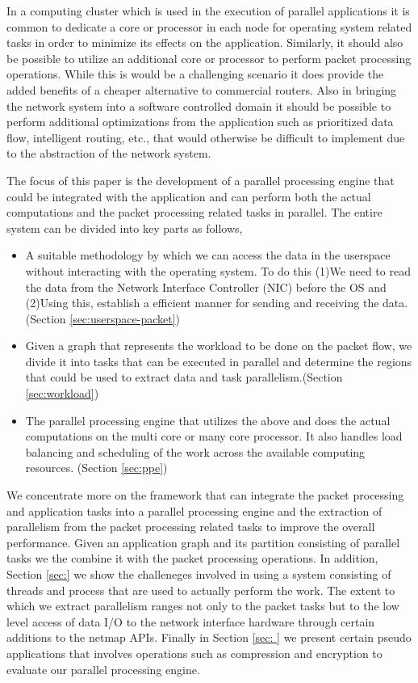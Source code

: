 \documentclass[conference]{IEEEtran}
\begin{document}
In a computing cluster which is used in the execution of parallel applications it is common to dedicate a core or processor in each node for operating system related tasks in order to minimize its effects on the application. Similarly, it should also be possible to utilize an additional core or processor to perform packet processing operations. While this is would be a challenging scenario it does provide the added benefits of a cheaper alternative to commercial routers. Also in bringing the network system into a software controlled domain it should be possible to perform additional optimizations from the application such as prioritized data flow, intelligent routing, etc., that would otherwise be difficult to implement due to the abstraction of the network system. 

The focus of this paper is the development of a parallel processing engine that could be integrated with the application and can perform both the actual computations and the packet processing related tasks in parallel. The entire system can be divided into key parts as follows,

\begin{itemize}

\item A suitable methodology by which we can access the data in the userspace without interacting with the operating system. To do this (1)We need to read the data from the Network Interface Controller (NIC) before the OS and (2)Using this, establish a efficient manner for sending and receiving the data.(Section \ref{sec:userspace-packet})

\item Given a graph that represents the workload to be done on the packet flow, we divide it into tasks that can be executed in parallel and determine the regions that could be used to extract data and task parallelism.(Section \ref{sec:workload})

\item The parallel processing engine that utilizes the above and does the actual computations on the multi core or many core processor. It also handles load balancing and scheduling of the work across the available computing resources. (Section \ref{sec:ppe})

\end{itemize} 

We concentrate more on the framework that can integrate the packet processing and application tasks into a parallel processing engine and the extraction of parallelism from the packet processing related tasks to improve the overall performance. Given an application graph and its partition consisting of parallel tasks we the combine it with the packet processing operations. In addition, Section \ref{sec:} we show the challeneges involved in using a system consisting of threads and process that are used to actually perform the work. The extent to which we extract parallelism ranges not only to the packet tasks but to the low level access of data I/O to the network interface hardware through certain additions to the netmap APIs. Finally in Section \ref{sec: } we present certain pseudo applications that involves operations such as compression and encryption to evaluate our parallel processing engine. 
 
\end{document}
